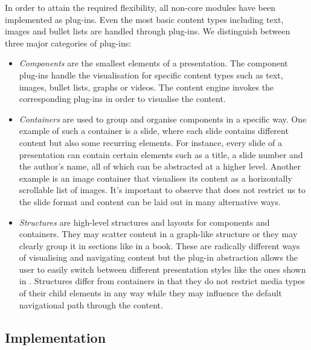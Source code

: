 
    In order to attain the required flexibility, all non-core modules have been
    implemented as plug-ins. Even the most basic content types including text,
    images and bullet lists are handled through plug-ins. We distinguish
    between three major categories of plug-ins:

    \begin{itemize}

     \item \emph{Components} are the smallest elements of a presentation. The
     component plug-ins handle the visualisation for specific content types
     such as text, images, bullet lists, graphs or videos. The content engine
     invokes the corresponding plug-ins in order to visualise the content.

     \item \emph{Containers} are used to group and organise components in a
     specific way. One example of such a container is a slide, where each slide
     contains different content but also some recurring elements. For instance,
     every slide of a presentation can contain certain elements such as a
     title, a slide number and the author's name, all of which can be
     abstracted at a higher level. Another example is an image container that
     visualises its content as a horizontally scrollable list of images. It's
     important to observe that \mxp does not restrict us to the slide format
     and content can be laid out in many alternative ways.

     \item \emph{Structures} are high-level structures and layouts for
     components and containers. They may scatter content in a graph-like
     structure or they may clearly group it in sections like in a book. These
     are radically different ways of visualising and navigating content but the
     plug-in abstraction allows the user to easily switch between different
     presentation styles like the ones shown in .
     Structures differ from containers in that they do not restrict media types
     of their child elements in any way while they may influence the default
     navigational path through the content.

    \end{itemize}

   \subsection{Implementation}


